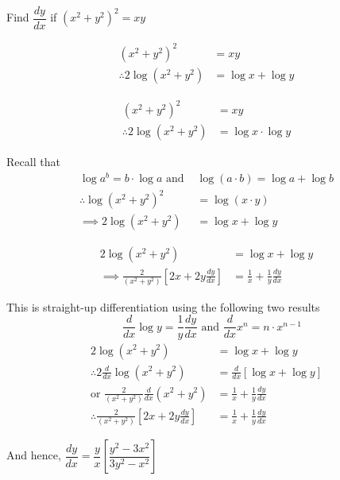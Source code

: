 \documentclass[14pt,fleqn]{extarticle}
\begin{document}
Find $\dfrac{dy}{dx}$ if $(x^2+y^2)^2 = xy$
%

\newcard

\begin{align}
	(x^2+y^2)^2 &= xy \\
	\therefore 2\log \left(x^2+y^2 \right) &= \log x + \log y 
\end{align}

\newcard

\begin{align}
	(x^2+y^2)^2 &= xy \\
	\therefore 2\log \left(x^2+y^2 \right) &= \log x \cdot \log y 
\end{align}

\newcard 

Recall that 
\begin{align}
	\log a^b = b\cdot\log a \text{ and }&\log \left(a\cdot b \right) = \log a + \log b \\
	\therefore \log \left(x^2+y^2 \right)^2 &= \log \left(x\cdot y \right) \\
	\implies 2\log \left(x^2 + y^2 \right) &= \log x + \log y 
\end{align}


\newcard

\begin{align}
	2\log \left(x^2 + y^2 \right) &= \log x + \log y \\
	\implies \frac{2}{\left(x^2 + y^2 \right)} \left[2x + 2y\frac{dy}{dx} \right] &= \frac{1}{x} + \frac{1}{y}\frac{dy}{dx}
\end{align}

\newcard 

This is straight-up differentiation using the following two results 
\[ \quad\frac{d}{dx}\log y = \frac{1}{y}\frac{dy}{dx}\text{ and } \frac{d}{dx} x^n = n\cdot x^{n-1}\]
%
\begin{align}
2\log (x^2+y^2) &= \log x + \log y  \\
\therefore 2\frac{d}{dx} \log \left(x^2 + y^2 \right) &= \frac{d}{dx} \left[\log x + \log y \right] \\
\text{or }\frac{2}{(x^2+y^2)}\frac{d}{dx}(x^2+y^2) &= \frac{1}{x} + \frac{1}{y}\frac{dy}{dx} \\
\therefore \frac{2}{(x^2+y^2)}\left[ 2x + 2y\frac{dy}{dx}\right] &= \frac{1}{x} + \frac{1}{y}\frac{dy}{dx}
\end{align}

\newcard

And hence, $\dfrac{dy}{dx} = \dfrac{y}{x}\left[ \dfrac{y^2-3x^2}{3y^2-x^2} \right]$
\end{document}
